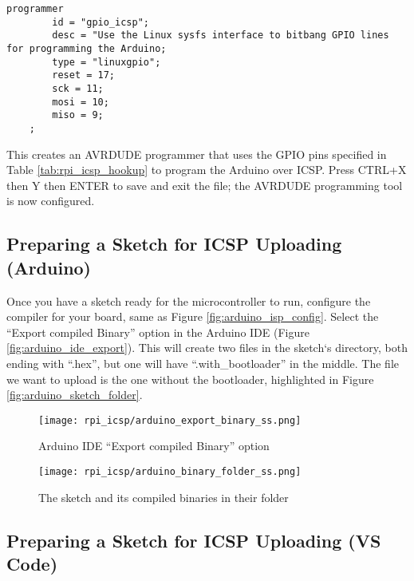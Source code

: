     \begin{lstlisting}[style=kaolstplain,linewidth=1.5\textwidth]
    programmer
        id = "gpio_icsp";
        desc = "Use the Linux sysfs interface to bitbang GPIO lines for programming the Arduino;
        type = "linuxgpio";
        reset = 17;
        sck = 11;
        mosi = 10;
        miso = 9;
    ;
    \end{lstlisting}

    This creates an AVRDUDE programmer that uses the GPIO pins specified in Table \ref{tab:rpi_icsp_hookup} to program the Arduino over ICSP. Press CTRL+X then Y then ENTER to save and exit the file; the AVRDUDE programming tool is now configured.

    \subsection*{Preparing a Sketch for ICSP Uploading (Arduino)}

    Once you have a sketch ready for the microcontroller to run, configure the compiler for your board, same as Figure \ref{fig:arduino_isp_config}.
    Select the ``Export compiled Binary'' option in the Arduino IDE (Figure \ref{fig:arduino_ide_export}). 
    This will create two files in the sketch`s directory, both ending with ``.hex'', but one will have ``.with\_bootloader'' in the middle. 
    The file we want to upload is the one without the bootloader, highlighted in Figure \ref{fig:arduino_sketch_folder}. \footnotemark
    
    
    \begin{figure}[h!]
        \texttt{[image: rpi\_icsp/arduino\_export\_binary\_ss.png]}
        \caption{Arduino IDE ``Export compiled Binary'' option}
    \end{figure}

    \begin{figure}[h!]
        \texttt{[image: rpi\_icsp/arduino\_binary\_folder\_ss.png]}
        \caption{The sketch and its compiled binaries in their folder}
    \end{figure}

    \subsection*{Preparing a Sketch for ICSP Uploading (VS Code)}

